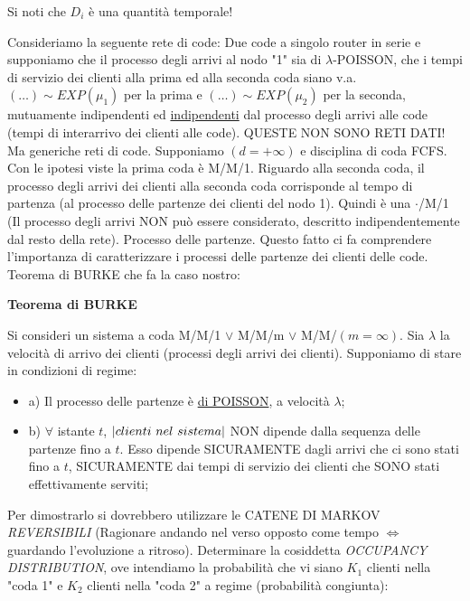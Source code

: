 Si noti che $D_i$ è una quantità temporale!


Consideriamo la seguente rete di code: Due code a singolo router in serie e supponiamo che il processo degli arrivi al nodo "1" sia di $\lambda$-POISSON, che i tempi di servizio dei clienti alla prima ed alla seconda coda siano v.a. $(\dots)\sim EXP(\mu_1)$ per la prima e $(\dots)\sim EXP(\mu_2)$ per la seconda, mutuamente indipendenti ed \underline{indipendenti} dal processo degli arrivi alle code (tempi di interarrivo dei clienti alle code). QUESTE NON SONO RETI DATI! Ma generiche reti di code. Supponiamo $(d=+\infty)$ e disciplina di coda FCFS. Con le ipotesi viste la prima coda è M/M/1. Riguardo alla seconda coda, il processo degli arrivi dei clienti alla seconda coda corrisponde al tempo di partenza (al processo delle partenze dei clienti del nodo 1). Quindi è una $\mathord{\cdot}$/M/1 (Il processo degli arrivi NON può essere considerato, descritto indipendentemente dal resto della rete). Processo delle partenze. Questo fatto ci fa comprendere l'importanza di caratterizzare i processi delle partenze dei clienti delle code. Teorema di BURKE che fa la caso nostro:

\begin{thrm}{\textbf{Teorema di BURKE}}

Si consideri un sistema a coda M/M/1 $\lor$ M/M/m $\lor$ M/M/$(m=\infty)$. Sia $\lambda$ la velocità di arrivo dei clienti (processi degli arrivi dei clienti). Supponiamo di stare in condizioni di regime:

\begin{itemize}

\item{a)} Il processo delle partenze è \underline{di POISSON}, a velocità $\lambda$;
\item{b)} $\forall$ istante $t$, $\left\vert{clienti\ nel\ sistema}\right\vert$ NON dipende dalla sequenza delle partenze fino a $t$. Esso dipende SICURAMENTE dagli arrivi che ci sono stati fino a $t$, SICURAMENTE dai tempi di servizio dei clienti che SONO stati effettivamente serviti;
\end{itemize}
\end{thrm}

Per dimostrarlo si dovrebbero utilizzare le CATENE DI MARKOV \textit{REVERSIBILI} (Ragionare andando nel verso opposto come tempo $\iff$ guardando l'evoluzione a ritroso).
Determinare la cosiddetta \textit{OCCUPANCY DISTRIBUTION}, ove intendiamo la probabilità che vi siano $K_1$ clienti nella "coda 1" e $K_2$ clienti nella "coda 2" a regime (probabilità congiunta):

